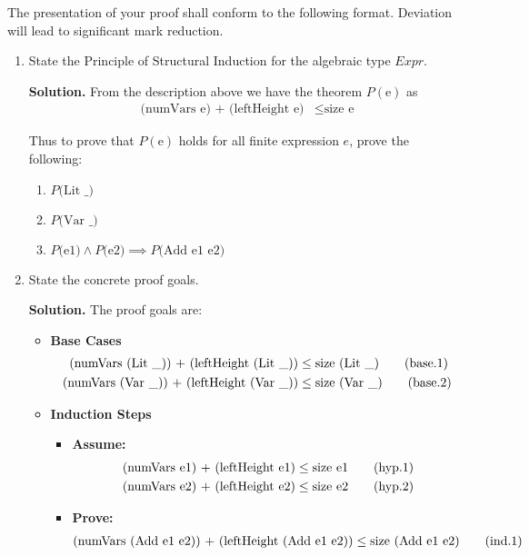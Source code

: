 \documentclass[11pt]{article}
\theoremstyle{definition}
\begin{document}
\begin{enumerate}
The presentation of your proof shall conform to the following format. Deviation will lead to significant mark reduction.

\begin{enumerate}
\item State the Principle of Structural Induction for the algebraic type $Expr$.

\textbf{Solution.} From the description above we have the theorem $P(\text{e})$ as
\begin{align*} 
\text{(numVars e) + (leftHeight e)} &\leq \text{size e}
\end{align*}

Thus to prove that $P(\text{e})$ holds for all finite expression $e$, prove the following:
\begin{enumerate}
\item $P\text{(Lit \_)}$
\item $P\text{(Var \_)}$
\item $P\text{(e1)} \land P\text{(e2)} \implies P\text{(Add e1 e2)}$
\end{enumerate}

\item State the concrete proof goals.

\textbf{Solution.} The proof goals are:

\begin{itemize}
  \item \textbf{Base Cases}
\begin{align*}
\text{(numVars (Lit \_)) + (leftHeight (Lit \_))} &\leq \text{size (Lit \_)} \tag{\text{base.1}}\\
\text{(numVars (Var \_)) + (leftHeight (Var \_))} &\leq \text{size (Var \_)} \tag{\text{base.2}}
\end{align*}
	\item \textbf{Induction Steps}
		\begin{itemize}
		\item \textbf{Assume:}
\begin{align*}
\text{(numVars e1) + (leftHeight e1)} &\leq \text{size e1} \tag{\text{hyp.1}} \\
\text{(numVars e2) + (leftHeight e2)} &\leq \text{size e2} \tag{\text{hyp.2}}
\end{align*}
		\item \textbf{Prove:}
\begin{align*}
\text{(numVars (Add e1 e2)) + (leftHeight (Add e1 e2))} &\leq \text{size (Add e1 e2)} \tag{\text{ind.1}} \\
\end{align*}
		\end{itemize}
\end{itemize}


\end{enumerate}
\end{enumerate}
\end{document}
